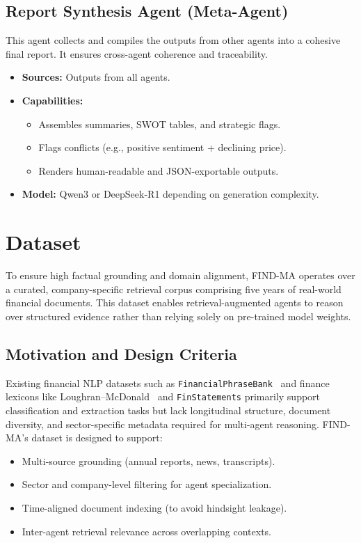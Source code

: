 \documentclass[11pt]{article}
\newcommand{\findma}{\textsc{FIND-MA}}
\begin{document}
\subsection*{Report Synthesis Agent (Meta-Agent)}
This agent collects and compiles the outputs from other agents into a cohesive final report. It ensures cross-agent coherence and traceability.
\begin{itemize}
    \item \textbf{Sources:} Outputs from all agents.
    \item \textbf{Capabilities:}
        \begin{itemize}
            \item Assembles summaries, SWOT tables, and strategic flags.
            \item Flags conflicts (e.g., positive sentiment + declining price).
            \item Renders human-readable and JSON-exportable outputs.
        \end{itemize}
    \item \textbf{Model:} Qwen3 or DeepSeek-R1 depending on generation complexity.
\end{itemize}

\section{Dataset}
\label{sec:dataset}
To ensure high factual grounding and domain alignment, \findma{} operates over a curated, company-specific retrieval corpus comprising five years of real-world financial documents. This dataset enables retrieval-augmented agents to reason over structured evidence rather than relying solely on pre-trained model weights.

\subsection*{Motivation and Design Criteria}
Existing financial NLP datasets such as \texttt{FinancialPhraseBank}~\citep{malo2014financialphrasebank} and finance lexicons like Loughran–McDonald~\citep{loughran2011when} and \texttt{FinStatements} primarily support classification and extraction tasks but lack longitudinal structure, document diversity, and sector-specific metadata required for multi-agent reasoning. \findma{}’s dataset is designed to support:
\begin{itemize}
    \item Multi-source grounding (annual reports, news, transcripts).
    \item Sector and company-level filtering for agent specialization.
    \item Time-aligned document indexing (to avoid hindsight leakage).
    \item Inter-agent retrieval relevance across overlapping contexts.
\end{itemize}
\end{document}
